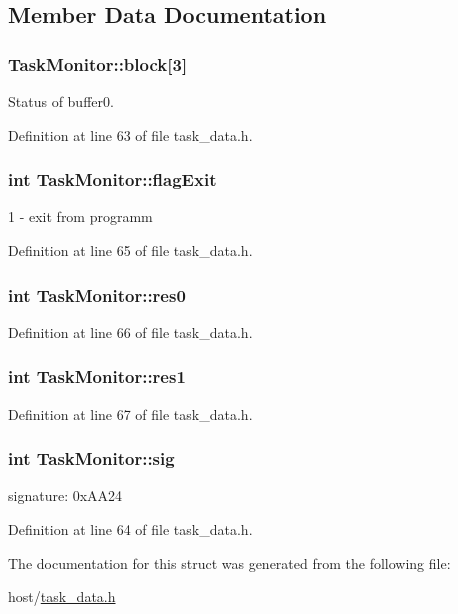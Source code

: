 \subsection{Member Data Documentation}
\hypertarget{structTaskMonitor_a2292dd95d5fff32a89158da1293f20fe}{
\subsubsection[{block}]{ {\bf TaskMonitor::block}\mbox{[}3\mbox{]}}}
\label{structTaskMonitor_a2292dd95d5fff32a89158da1293f20fe}


Status of buffer0. 

Definition at line 63 of file task\_\-data.h.\hypertarget{structTaskMonitor_a41a440978f13b970c075be89ebdb7ec4}{
\subsubsection[{flagExit}]{\setlength{\rightskip}{0pt plus 5cm}int {\bf TaskMonitor::flagExit}}}
\label{structTaskMonitor_a41a440978f13b970c075be89ebdb7ec4}


1 -\/ exit from programm 

Definition at line 65 of file task\_\-data.h.\hypertarget{structTaskMonitor_a41f47c7e06e461344d2db1dedf96f855}{
\subsubsection[{res0}]{\setlength{\rightskip}{0pt plus 5cm}int {\bf TaskMonitor::res0}}}
\label{structTaskMonitor_a41f47c7e06e461344d2db1dedf96f855}


Definition at line 66 of file task\_\-data.h.\hypertarget{structTaskMonitor_adddd04eb115df06c13900b986277d52c}{
\subsubsection[{res1}]{\setlength{\rightskip}{0pt plus 5cm}int {\bf TaskMonitor::res1}}}
\label{structTaskMonitor_adddd04eb115df06c13900b986277d52c}


Definition at line 67 of file task\_\-data.h.\hypertarget{structTaskMonitor_ac6ff7600f359c32ee18e85d3ac923075}{
\subsubsection[{sig}]{\setlength{\rightskip}{0pt plus 5cm}int {\bf TaskMonitor::sig}}}
\label{structTaskMonitor_ac6ff7600f359c32ee18e85d3ac923075}


signature: 0xAA24 

Definition at line 64 of file task\_\-data.h.

The documentation for this struct was generated from the following file:\begin{DoxyCompactItemize}
\item 
host/\hyperlink{task__data_8h}{task\_\-data.h}\end{DoxyCompactItemize}
